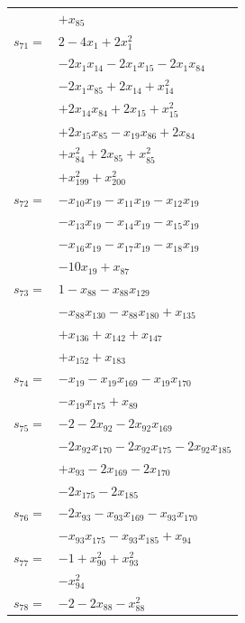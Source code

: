 \begin{longtable}{@{}r@{\;}l@{}}
 & \(\displaystyle +x_{85}\) \\[3pt]
\(s_{71}=\) & \(\displaystyle 2 -4x_{1} +2x_{1}^{2}\) \\
 & \(\displaystyle -2x_{1}x_{14} -2x_{1}x_{15} -2x_{1}x_{84}\) \\
 & \(\displaystyle -2x_{1}x_{85} +2x_{14} +x_{14}^{2}\) \\
 & \(\displaystyle +2x_{14}x_{84} +2x_{15} +x_{15}^{2}\) \\
 & \(\displaystyle +2x_{15}x_{85} -x_{19}x_{86} +2x_{84}\) \\
 & \(\displaystyle +x_{84}^{2} +2x_{85} +x_{85}^{2}\) \\
 & \(\displaystyle +x_{199}^{2} +x_{200}^{2}\) \\[3pt]
\(s_{72}=\) & \(\displaystyle -x_{10}x_{19} -x_{11}x_{19} -x_{12}x_{19}\) \\
 & \(\displaystyle -x_{13}x_{19} -x_{14}x_{19} -x_{15}x_{19}\) \\
 & \(\displaystyle -x_{16}x_{19} -x_{17}x_{19} -x_{18}x_{19}\) \\
 & \(\displaystyle -10x_{19} +x_{87}\) \\[3pt]
\(s_{73}=\) & \(\displaystyle 1 -x_{88} -x_{88}x_{129}\) \\
 & \(\displaystyle -x_{88}x_{130} -x_{88}x_{180} +x_{135}\) \\
 & \(\displaystyle +x_{136} +x_{142} +x_{147}\) \\
 & \(\displaystyle +x_{152} +x_{183}\) \\[3pt]
\(s_{74}=\) & \(\displaystyle -x_{19} -x_{19}x_{169} -x_{19}x_{170}\) \\
 & \(\displaystyle -x_{19}x_{175} +x_{89}\) \\[3pt]
\(s_{75}=\) & \(\displaystyle -2 -2x_{92} -2x_{92}x_{169}\) \\
 & \(\displaystyle -2x_{92}x_{170} -2x_{92}x_{175} -2x_{92}x_{185}\) \\
 & \(\displaystyle +x_{93} -2x_{169} -2x_{170}\) \\
 & \(\displaystyle -2x_{175} -2x_{185}\) \\[3pt]
\(s_{76}=\) & \(\displaystyle -2x_{93} -x_{93}x_{169} -x_{93}x_{170}\) \\
 & \(\displaystyle -x_{93}x_{175} -x_{93}x_{185} +x_{94}\) \\[3pt]
\(s_{77}=\) & \(\displaystyle -1 +x_{90}^{2} +x_{93}^{2}\) \\
 & \(\displaystyle -x_{94}^{2}\) \\[3pt]
\(s_{78}=\) & \(\displaystyle -2 -2x_{88} -x_{88}^{2}\) \\

\end{longtable}
